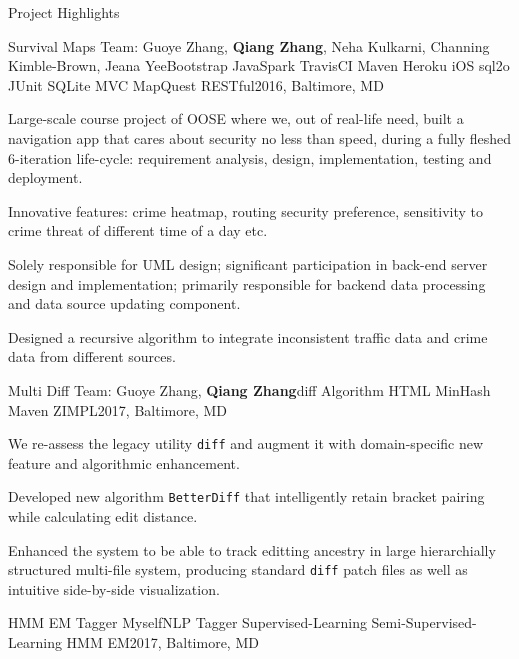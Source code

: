 \documentclass{resume} %
\begin{document}
\begin{rSection}{Project Highlights}

\begin{rSubsection}{Survival Maps \href{https://github.com/cc941201/SurvivalMaps}{\textcolor{blue}{\faGithub}}}{Team: Guoye Zhang, {\bf Qiang Zhang}, Neha Kulkarni, Channing Kimble-Brown, Jeana Yee}{Bootstrap JavaSpark TravisCI Maven Heroku iOS sql2o JUnit SQLite MVC MapQuest RESTful}{2016, Baltimore, MD}
\item Large-scale course project of OOSE where we, out of real-life need, built a navigation app that cares about security no less than speed, during a fully fleshed 6-iteration life-cycle: requirement analysis, design, implementation, testing and deployment.
\item Innovative features: crime heatmap, routing security preference, sensitivity to crime threat of different time of a day etc.
\item Solely responsible for UML design; significant participation in back-end server design and implementation; primarily responsible for backend data processing and data source updating component.
\item Designed a recursive algorithm to integrate inconsistent traffic data and crime data from different sources.
\end{rSubsection}
\begin{rSubsection}{Multi Diff \href{https://github.com/vegito2002/multi-diff}{\textcolor{blue}{\faGithub}}}{Team: Guoye Zhang, {\bf Qiang Zhang}}{diff Algorithm HTML MinHash Maven ZIMPL}{2017, Baltimore, MD}
\item We re-assess the legacy utility \texttt{diff} and augment it with domain-specific new feature and algorithmic enhancement.
\item Developed new algorithm \texttt{BetterDiff} that intelligently retain bracket pairing while calculating edit distance.
\item Enhanced the system to be able to track editting ancestry in large hierarchially structured multi-file system, producing standard \texttt{diff} patch files as well as intuitive side-by-side visualization.
\end{rSubsection}
\begin{rSubsection}{HMM EM Tagger \href{https://github.com/vegito2002/hmm-em-tagger}{\textcolor{blue}{\faGithub}}}{Myself}{NLP Tagger Supervised-Learning Semi-Supervised-Learning HMM EM}{2017, Baltimore, MD}

\end{rSubsection}
\end{rSection}
\end{document}
